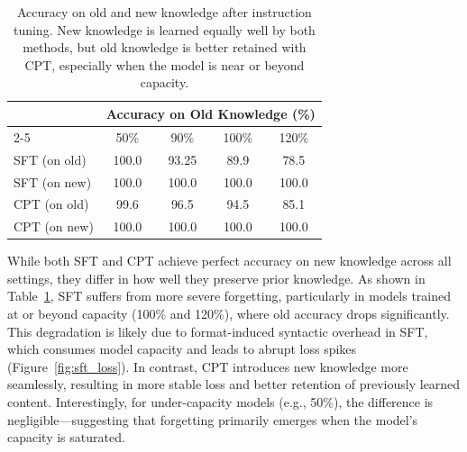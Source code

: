 \documentclass[11pt]{article}
\theoremstyle{plain}
\theoremstyle{definition}
\begin{document}
\begin{table}[h]
  \centering
  \caption{
    Accuracy on old and new knowledge after instruction tuning. New knowledge is learned equally well by both methods, but old knowledge is better retained with CPT, especially when the model is near or beyond capacity.
  }
  \label{tab:sft_cpt_accuracy}
  \begin{tabular}{lcccc}
    \toprule
    & \multicolumn{4}{c}{Accuracy on Old Knowledge (\%)} \\
    \cmidrule(lr){2-5}
    & 50\% & 90\% & 100\% & 120\% \\
    \midrule
    SFT (on old) & 100.0 & 93.25 & 89.9 & 78.5 \\
    SFT (on new) & 100.0 & 100.0 & 100.0 & 100.0 \\
    CPT (on old) & 99.6  & 96.5  & 94.5  & 85.1 \\
    CPT (on new) & 100.0 & 100.0 & 100.0 & 100.0 \\
    \bottomrule
  \end{tabular}
\end{table}
While both SFT and CPT achieve perfect accuracy on new knowledge across all settings, they differ in how well they preserve prior knowledge. As shown in Table~\ref{tab:sft_cpt_accuracy}, SFT suffers from more severe forgetting, particularly in models trained at or beyond capacity (100\% and 120\%), where old accuracy drops significantly. This degradation is likely due to format-induced syntactic overhead in SFT, which consumes model capacity and leads to abrupt loss spikes (Figure~\ref{fig:sft_loss}). In contrast, CPT introduces new knowledge more seamlessly, resulting in more stable loss and better retention of previously learned content. Interestingly, for under-capacity models (e.g., 50\%), the difference is negligible—suggesting that forgetting primarily emerges when the model’s capacity is saturated.
\end{document}
